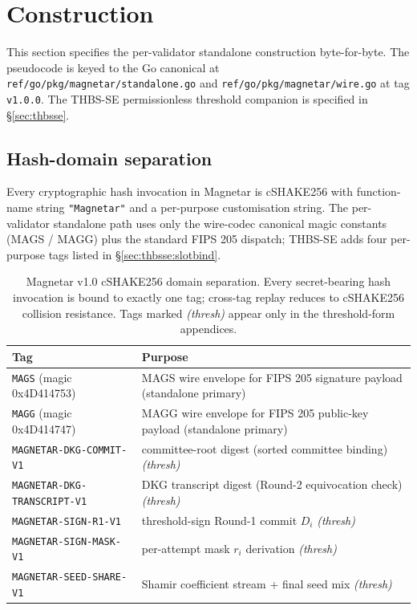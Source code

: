 \section{Construction}
\label{sec:construction}

This section specifies the per-validator standalone construction
byte-for-byte. The pseudocode is keyed to the Go canonical at
\texttt{ref/go/pkg/magnetar/standalone.go} and
\texttt{ref/go/pkg/magnetar/wire.go} at tag \texttt{v1.0.0}. The
THBS-SE permissionless threshold companion is specified in
\S\ref{sec:thbsse}.

\subsection{Hash-domain separation}
\label{sec:construction:domains}

Every cryptographic hash invocation in Magnetar is cSHAKE256
\cite{sp800185} with function-name string \texttt{"Magnetar"} and a
per-purpose customisation string. The per-validator standalone path
uses only the wire-codec canonical magic constants (MAGS / MAGG)
plus the standard FIPS 205 dispatch; THBS-SE adds four
per-purpose tags listed in \S\ref{sec:thbsse:slotbind}.

\begin{table}[H]
\centering
\caption{Magnetar v1.0 cSHAKE256 domain separation. Every
secret-bearing hash invocation is bound to exactly one tag;
cross-tag replay reduces to cSHAKE256 collision resistance.
Tags marked \emph{(thresh)} appear only in the threshold-form
appendices.}
\label{tab:magnetar-tags}
\begin{tabular}{lp{8.5cm}}
\toprule
Tag & Purpose \\
\midrule
\texttt{MAGS} (magic 0x4D414753) & MAGS wire envelope for FIPS 205 signature payload (standalone primary) \\
\texttt{MAGG} (magic 0x4D414747) & MAGG wire envelope for FIPS 205 public-key payload (standalone primary) \\
\texttt{MAGNETAR-DKG-COMMIT-V1} & committee-root digest (sorted committee binding) \emph{(thresh)} \\
\texttt{MAGNETAR-DKG-TRANSCRIPT-V1} & DKG transcript digest (Round-2 equivocation check) \emph{(thresh)} \\
\texttt{MAGNETAR-SIGN-R1-V1} & threshold-sign Round-1 commit $D_i$ \emph{(thresh)} \\
\texttt{MAGNETAR-SIGN-MASK-V1} & per-attempt mask $r_i$ derivation \emph{(thresh)} \\
\texttt{MAGNETAR-SEED-SHARE-V1} & Shamir coefficient stream + final seed mix \emph{(thresh)} \\
\bottomrule
\end{tabular}
\end{table}

